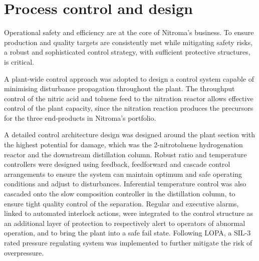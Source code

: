 \section*{Process control and design}

Operational safety and efficiency are at the core of Nitroma's business. To ensure production and quality targets are consistently met while mitigating safety risks, a robust and sophisticated control strategy, with sufficient protective structures, is critical.

A plant-wide control approach was adopted to design a control system capable of minimising disturbance propagation throughout the plant.  The throughput control of the nitric acid and toluene feed to the nitration reactor allows effective control of the plant capacity, since the nitration reaction produces the precursors for the three end-products in Nitroma's portfolio.   


A detailed control architecture design was designed around the plant section with the highest potential for damage, which was the 2-nitrotoluene hydrogenation reactor and the downstream distillation column. Robust ratio and temperature controllers were designed using feedback, feedforward and cascade control arrangements to ensure the system can maintain optimum and safe operating conditions and adjust to disturbances. Inferential temperature control was also cascaded onto the slow composition controller in the distillation column, to ensure tight quality control of the separation. Regular and executive alarms, linked to automated interlock actions, were integrated to the control structure as an additional layer of protection to respectively alert to operators of abnormal operation, and to bring the plant into a safe fail state. Following LOPA, a SIL-3 rated pressure regulating system was implemented to further mitigate the risk of overpressure.




